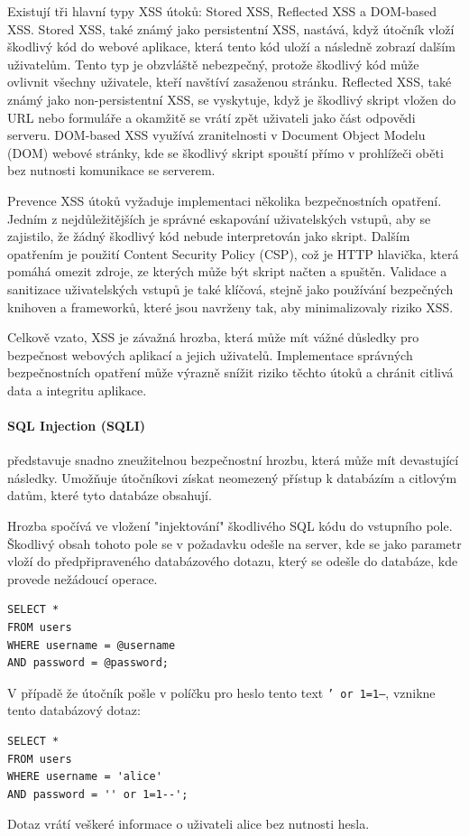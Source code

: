 \documentclass[12pt, a4paper]{article}
\begin{document}
Existují tři hlavní typy XSS útoků: Stored XSS, Reflected XSS a DOM-based XSS. Stored XSS, také známý jako persistentní XSS, nastává, když útočník vloží škodlivý kód do webové aplikace, která tento kód uloží a následně zobrazí dalším uživatelům. Tento typ je obzvláště nebezpečný, protože škodlivý kód může ovlivnit všechny uživatele, kteří navštíví zasaženou stránku. Reflected XSS, také známý jako non-persistentní XSS, se vyskytuje, když je škodlivý skript vložen do URL nebo formuláře a okamžitě se vrátí zpět uživateli jako část odpovědi serveru. DOM-based XSS využívá zranitelnosti v Document Object Modelu (DOM) webové stránky, kde se škodlivý skript spouští přímo v prohlížeči oběti bez nutnosti komunikace se serverem.

Prevence XSS útoků vyžaduje implementaci několika bezpečnostních opatření. Jedním z nejdůležitějších je správné eskapování uživatelských vstupů, aby se zajistilo, že žádný škodlivý kód nebude interpretován jako skript. Dalším opatřením je použití Content Security Policy (CSP), což je HTTP hlavička, která pomáhá omezit zdroje, ze kterých může být skript načten a spuštěn. Validace a sanitizace uživatelských vstupů je také klíčová, stejně jako používání bezpečných knihoven a frameworků, které jsou navrženy tak, aby minimalizovaly riziko XSS.

Celkově vzato, XSS je závažná hrozba, která může mít vážné důsledky pro bezpečnost webových aplikací a jejich uživatelů. Implementace správných bezpečnostních opatření může výrazně snížit riziko těchto útoků a chránit citlivá data a integritu aplikace.\cite{the_owasp_foundation_cross_nodate-1}
\paragraph{SQL Injection (SQLI)}
představuje snadno zneužitelnou bezpečnostní hrozbu, která může mít devastující následky. Umožňuje útočníkovi získat neomezený přístup k databázím a citlovým datům, které tyto databáze obsahují.

Hrozba spočívá ve vložení "injektování" škodlivého SQL kódu do vstupního pole. Škodlivý obsah tohoto pole se v požadavku odešle na server, kde se jako parametr vloží do předpřipraveného databázového dotazu, který se odešle do databáze, kde provede nežádoucí operace.
\begin{verbatim}
SELECT *
FROM users
WHERE username = @username
AND password = @password;
\end{verbatim}
V případě že útočník pošle v políčku pro heslo tento text \texttt{' or 1=1--}, vznikne tento databázový dotaz:
\begin{verbatim}
SELECT *
FROM users
WHERE username = 'alice'
AND password = '' or 1=1--';
\end{verbatim}
Dotaz vrátí veškeré informace o uživateli alice bez nutnosti hesla.
\end{document}
